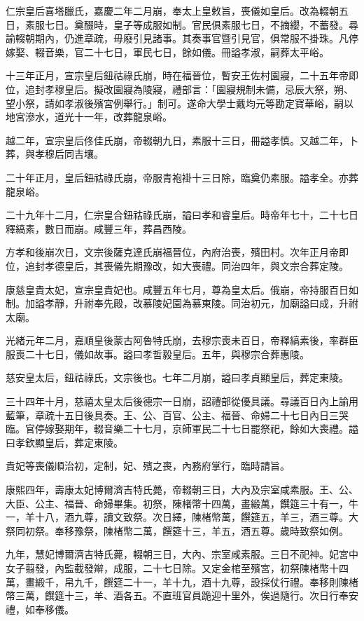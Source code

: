 \begin{pinyinscope}
仁宗皇后喜塔臘氏，嘉慶二年二月崩，奉太上皇敕旨，喪儀如皇后。改為輟朝五日，素服七日。奠醊時，皇子等成服如制。官民俱素服七日，不摘纓，不蓄發。尋諭輟朝期內，仍進章疏，毋廢引見諸事。其奏事官暨引見官，俱常服不掛珠。凡停嫁娶、輟音樂，官二十七日，軍民七日，餘如儀。冊謚孝淑，嗣葬太平峪。

十三年正月，宣宗皇后鈕祜祿氏崩，時在福晉位，暫安王佐村園寢，二十五年帝即位，追封孝穆皇后。擬改園寢為陵寢，禮部言：「園寢規制未備，忌辰大祭，朔、望小祭，請如孝淑後殯宮例舉行。」制可。遂命大學士戴均元等勘定寶華峪，嗣以地宮滲水，道光十一年，改葬龍泉峪。

越二年，宣宗皇后佟佳氏崩，帝輟朝九日，素服十三日，冊謚孝慎。又越二年，卜葬，與孝穆后同吉壤。

二十年正月，皇后鈕祜祿氏崩，帝服青袍褂十三日除，臨奠仍素服。謚孝全。亦葬龍泉峪。

二十九年十二月，仁宗皇合鈕祜祿氏崩，謚曰孝和睿皇后。時帝年七十，二十七日釋縞素，數日而崩。咸豐三年，葬昌西陵。

方孝和後崩次日，文宗後薩克達氏崩福晉位，內府治喪，殯田村。次年正月帝即位，追封孝德皇后，其喪儀先期豫改，如大喪禮。同治四年，與文宗合葬定陵。

康慈皇貴太妃，宣宗皇貴妃也。咸豐五年七月，尊為皇太后。俄崩，帝持服百日如制。加謚孝靜，升祔奉先殿，改慕陵妃園為慕東陵。同治初元，加廟謚曰成，升祔太廟。

光緒元年二月，嘉順皇後蒙古阿魯特氏崩，去穆宗喪未百日，帝釋縞素後，率群臣服喪二十七日，儀如故事。謚曰孝哲毅皇后。五年，與穆宗合葬惠陵。

慈安皇太后，鈕祜祿氏，文宗後也。七年二月崩，謚曰孝貞顯皇后，葬定東陵。

三十四年十月，慈禧太皇太后後德宗一日崩，詔禮部從優具議。尋議百日內上諭用藍筆，章疏十五日後具奏。王、公、百官、公主、福晉、命婦二十七日內日三哭臨。官停嫁娶期年，輟音樂二十七月，京師軍民二十七日罷祭祀，餘如大喪禮。謚曰孝欽顯皇后，葬定東陵。

貴妃等喪儀順治初，定制，妃、殯之喪，內務府掌行，臨時請旨。

康熙四年，壽康太妃博爾濟吉特氏薨，帝輟朝三日，大內及宗室咸素服。王、公、大臣、公主、福晉、命婦畢集。初祭，陳楮幣十四萬，畫緞萬，饌筵三十有一，牛一，羊十八，酒九尊，讀文致祭。次日繹，陳楮幣萬，饌筵五，羊三，酒三尊。大祭同初祭。奉移豫祭，陳楮幣二萬，饌筵十三，羊五，酒五尊。歲時致祭如例。

九年，慧妃博爾濟吉特氏薨，輟朝三日，大內、宗室咸素服。三日不祀神。妃宮中女子翦發，內監截發辮，成服，二十七日除。又定金棺至殯宮，初祭陳楮幣十四萬，畫緞千，帛九千，饌筵二十一，羊十九，酒十九尊，設採仗行禮。奉移則陳楮幣三萬，饌筵十三，羊、酒各五。不直班官員跪迎十里外，俟過隨行。次日行奉安禮，如奉移儀。


\end{pinyinscope}
